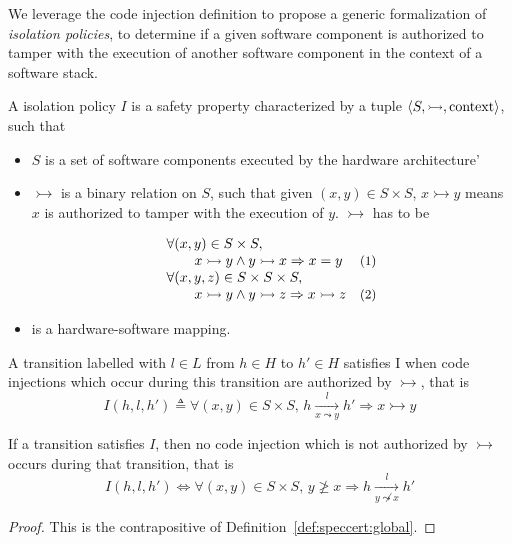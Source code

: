 We leverage the code injection definition to propose a generic formalization of
\emph{isolation policies}, to determine if a given software component is
authorized to tamper with the execution of another software component in the
context of a software stack.

\begin{definition}
  \label{def:speccert:global}
  A isolation policy $I$ is a safety property characterized by a tuple
  $\langle S, \rightarrowtail, \mathrm{context} \rangle$, such that
  \begin{itemize}
  \item $S$ is a set of software components executed by the hardware
    architecture'
  \item $\rightarrowtail$ is a binary relation on $S$, such that given
    $(x, y) \in S \times S$, $x \rightarrowtail y$ means $x$ is authorized to
    tamper with the execution of $y$. $\rightarrowtail$ has to be
    \[
      \begin{array}{lr}
        \forall (x, y) \in S \times S,
        & \\
        \qquad x \rightarrowtail y \wedge y
        \rightarrowtail x \Rightarrow x = y
        & \text{\small (1)} \\
        \forall (x, y, z) \in S \times S \times S,
        & \\
        \qquad x \rightarrowtail y \wedge y
        \rightarrowtail z \Rightarrow x \rightarrowtail z
        & \text{\small (2)}
      \end{array}
    \]
  \item {} is a hardware-software mapping.
  \end{itemize}

  A transition labelled with $l \in L$ from $h \in H$ to $h' \in H$ satisfies I
  when code injections which occur during this transition are authorized by
  $\rightarrowtail$, that is
  \[
    I(h, l, h') \triangleq \forall (x, y) \in S \times S \text{, } h
    \xrightarrow[x \leadsto y]{l} h' \Rightarrow x \rightarrowtail y
  \]
\end{definition}

\begin{corollary}
  If a transition satisfies $I$, then no code injection which is not authorized
  by $\rightarrowtail$ occurs during that transition, that is
  \[
    I(h, l, h') \iff \forall (x, y) \in S \times S \text{, } y \not\ge x
    \Rightarrow h \xrightarrow[y \not\leadsto x]{l} h'
  \]

  \begin{proof}
    This is the contrapositive of Definition~\ref{def:speccert:global}.
  \end{proof}
\end{corollary}

